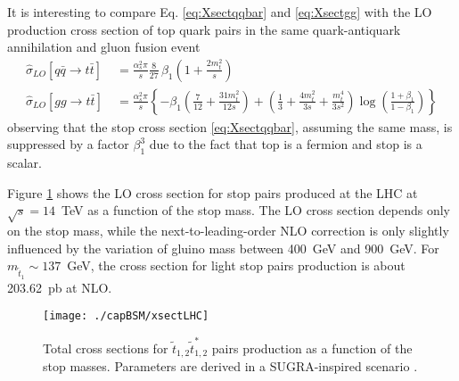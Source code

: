 It is interesting to compare Eq. \ref{eq:Xsectqqbar} and \ref{eq:Xsectgg} with the LO production cross section of top quark pairs in the same quark-antiquark annihilation and gluon fusion event
\begin{align}
\hat{\sigma}_{LO}[q\bar{q}\rightarrow t\bar{t}] &\ = \frac{\alpha_s^2 \pi}{s} \frac{8}{27}\,\beta_1 \left(1 + \frac{2m_{t}^2}{s}\right) \label{eq:XsectTOPqqbar}\\
\hat{\sigma}_{LO}[gg\rightarrow t\bar{t}]       &\ = \frac{\alpha_s^2 \pi}{s} \left\{ 
        - \beta_1 \left( \frac{7}{12} + \frac{31m_t^2}{12s} \right)
      + \left(\frac{1}{3}+ \frac{4m_t^2}{3s} + \frac{m_t^4}{3s^2} \right)
        \log\left(\frac{1+\beta_1}{1-\beta_1}\right) \right\} \label{eq:XsectTOPgg}
\end{align} observing that the stop cross section \ref{eq:Xsectqqbar}, assuming the same mass, is suppressed by a factor $\beta_1^3$ due to the fact that top is a fermion and stop is a scalar.

Figure \ref{xsectLHC} shows the LO cross section for stop pairs produced at the LHC at $\sqrt{s}=14$~TeV as a function of the stop mass. The LO cross section depends only on the stop mass, while the next-to-leading-order NLO correction is only slightly influenced by the variation of gluino mass between 400~GeV and 900~GeV. For $m_{\tilde{t}_1}\sim137$~GeV, the cross section for light stop pairs production is about 203.62~pb at NLO.
\begin{figure}[htb]\begin{center}
\texttt{[image: ./capBSM/xsectLHC]}\caption{Total cross sections for $\tilde{t}_{1,2}\tilde{t}_{1,2}^*$ pairs production as a function of the stop masses. Parameters are derived in a SUGRA-inspired scenario \cite{beenakker-1998-515}.}
\label{xsectLHC}\end{center}\end{figure}

